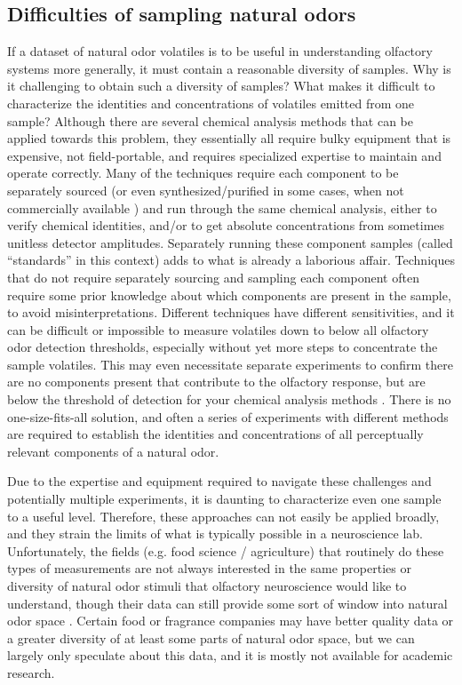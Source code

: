 \documentclass[12pt]{caltech_thesis}
\renewcommand{\cite}{{ }\autocite}
\let\Oldsection\section
\renewcommand{\section}{\FloatBarrier\Oldsection}
\begin{document}
\begin{refsection}
\section{Difficulties of sampling natural odors}
\label{sec:sampling_difficulty}
If a dataset of natural odor volatiles is to be useful in understanding olfactory systems more generally, it must contain a reasonable diversity of samples.
Why is it challenging to obtain such a diversity of samples?
What makes it difficult to characterize the identities and concentrations of volatiles emitted from one sample?
Although there are several chemical analysis methods that can be applied towards this problem, they essentially all require bulky equipment that is  expensive, not field-portable, and requires specialized expertise to maintain and operate correctly.
Many of the techniques require each component to be separately sourced (or even synthesized/purified in some cases, when not commercially available\cite{FlyBeerPreference}) and run through the same chemical analysis, either to verify chemical identities, and/or to get absolute concentrations from sometimes unitless detector amplitudes.
Separately running these component samples (called ``standards'' in this context) adds to what is already a laborious affair.
Techniques that do not require separately sourcing and sampling each component often require some prior knowledge about which components are present in the sample, to avoid misinterpretations.
Different techniques have different sensitivities, and it can be difficult or impossible to measure volatiles down to below all olfactory odor detection thresholds, especially without yet more steps to concentrate the sample volatiles.
This may even necessitate separate experiments to confirm there are no components present that contribute to the olfactory response, but are below the threshold of detection for your chemical analysis methods\cite{Riffell2012,ComparativeDrosImaging,TraceFIDOlfResponses}.
There is no one-size-fits-all solution, and often a series of experiments with different methods are required to establish the identities and concentrations of all perceptually relevant components of a natural odor.

Due to the expertise and equipment required to navigate these challenges and potentially multiple experiments, it is daunting to characterize even one sample to a useful level.
Therefore, these approaches can not easily be applied broadly, and they strain the limits of what is typically possible in a neuroscience lab.
Unfortunately, the fields (e.g. food science / agriculture) that routinely do these types of measurements are not always interested in the same properties or diversity of natural odor stimuli that olfactory neuroscience would like to understand, though their data can still provide some sort of window into natural odor space\cite{Schreurs2024,YeastNectarAttraction}.
Certain food or fragrance companies may have better quality data or a greater diversity of at least some parts of natural odor space, but we can largely only speculate about this data, and it is mostly not available for academic research.


\end{refsection}
\end{document}
